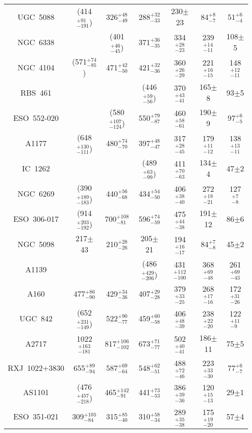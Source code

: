 \begin{table}
\begin{center}
{\begin{tabular}{ccccccc}
    UGC~5088 & (414$^{+91}_{-191}$) & 326$^{+48}_{-49}$ & 288$^{+32}_{-33}$ & 230$\pm$23 & 84$^{+8}_{-7}$ & 51$^{+6}_{-4}$ \\
    NGC~6338 & & (401$^{+46}_{-45}$) & 371$^{+36}_{-35}$ & 334$^{+28}_{-23}$ & 239$^{+14}_{-11}$ & 108$\pm$5 \\
    NGC~4104 & (571$^{+74}_{-85}$) & 471$^{+42}_{-50}$ & 421$^{+32}_{-36}$ & 360$^{+26}_{-29}$ & 221$^{+16}_{-15}$ & 148$^{+12}_{-11}$ \\
    RBS~461 & & & (446$^{+59}_{-56}$) & 370$^{+43}_{-41}$ & 165$\pm$8 & 93$\pm$5 \\
    ESO~552-020 & & (580$^{+107}_{-124}$) & 550$^{+79}_{-87}$ & 460$^{+58}_{-61}$ & 190$\pm$9 & 97$^{+6}_{-5}$ \\
    A1177 & (648$^{+130}_{-111}$) & 480$^{+74}_{-70}$ & 397$^{+48}_{-47}$ & 317$^{+28}_{-45}$ & 179$^{+11}_{-12}$ & 138$^{+13}_{-11}$ \\
    IC~1262 & & & (489$^{+63}_{-99}$) & 411$^{+70}_{-63}$ & 134$\pm$4 & 47$\pm$2 \\
    NGC~6269 & (390$^{+189}_{-183}$) & 440$^{+56}_{-68}$ & 434$^{+54}_{-50}$ & 406$^{+38}_{-40}$ & 272$^{+18}_{-21}$ & 127$^{+7}_{-8}$ \\
    ESO~306-017 & (914$^{+203}_{-192}$) & 700$^{+108}_{-81}$ & 596$^{+74}_{-59}$ & 475$^{+44}_{-38}$ & 191$\pm$12 & 86$\pm$6 \\
    NGC~5098 & 217$\pm$43 & 210$^{+28}_{-26}$ & 205$\pm$21 & 194$^{+16}_{-17}$ & 84$^{+7}_{-8}$ & 45$\pm$2 \\
    A1139 & & & (486$^{+429}_{-206}$) & 431$^{+112}_{-100}$ & 368$^{+69}_{-48}$ & 261$^{+69}_{-43}$ \\
    A160 & 477$^{+86}_{-90}$ & 429$^{+34}_{-36}$ & 407$^{+29}_{-28}$ & 379$^{+33}_{-25}$ & 268$^{+17}_{-16}$ & 172$^{+31}_{-26}$ \\
    UGC~842 & (652$^{+231}_{-149}$) & 522$^{+90}_{-77}$ & 459$^{+60}_{-58}$ & 406$^{+48}_{-39}$ & 238$^{+22}_{-20}$ & 122$^{+11}_{-9}$ \\
    A2717 & 1022$^{+163}_{-181}$ & 817$^{+106}_{-102}$ & 673$^{+71}_{-77}$ & 502$^{+40}_{-41}$ & 186$\pm$11 & 75$\pm$5 \\
    RXJ~1022+3830 & 655$^{+89}_{-94}$ & 587$^{+69}_{-64}$ & 548$^{+62}_{-51}$ & 488$^{+72}_{-46}$ & 223$^{+33}_{-30}$ & 77$^{+6}_{-7}$ \\
    AS1101 & (476$^{+457}_{-218}$) & 465$^{+142}_{-91}$ & 441$^{+73}_{-53}$ & 386$^{+39}_{-36}$ & 120$^{+15}_{-13}$ & 29$\pm$1 \\
    ESO~351-021 & 309$^{+105}_{-84}$ & 315$^{+85}_{-40}$ & 310$^{+58}_{-34}$ & 289$^{+35}_{-38}$ & 175$^{+19}_{-20}$ & 57$\pm$4 \\

\end{tabular}}
\end{center}
\end{table}
